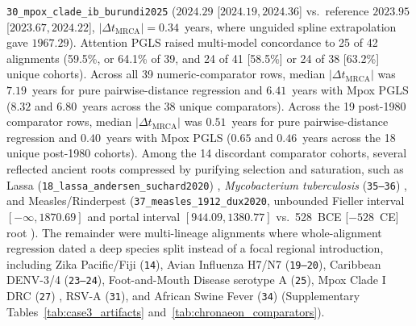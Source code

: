 \documentclass[11pt,letterpaper]{article}
\begin{document}
\texttt{30\_mpox\_clade\_ib\_burundi2025} ($2024.29$ [$2024.19, 2024.36$] vs.\ reference $2023.95$ [$2023.67, 2024.22$], $|\Delta t_{\mathrm{MRCA}}| = 0.34$~years, where unguided spline extrapolation gave $1967.29$). Attention PGLS raised multi-model concordance to 25 of 42 alignments (59.5\%, or 64.1\% of 39, and 24 of 41 [58.5\%] or 24 of 38 [63.2\%] unique cohorts). Across all 39 numeric-comparator rows, median $|\Delta t_{\mathrm{MRCA}}|$ was $7.19$~years for pure pairwise-distance regression and $6.41$~years with Mpox PGLS ($8.32$ and $6.80$~years across the 38 unique comparators). Across the 19 post-1980 comparator rows, median $|\Delta t_{\mathrm{MRCA}}|$ was $0.51$~years for pure pairwise-distance regression and $0.40$~years with Mpox PGLS ($0.65$ and $0.46$~years across the 18 unique post-1980 cohorts). Among the 14 discordant comparator cohorts, several reflected ancient roots compressed by purifying selection and saturation, such as Lassa (\texttt{18\_lassa\_andersen\_suchard2020}) \cite{andersen2015lassa, suchard2020lassa}, \textit{Mycobacterium tuberculosis} (\texttt{35--36}) \cite{comas2013mtb, bos2014mtb}, and Measles/Rinderpest (\texttt{37\_measles\_1912\_dux2020}, unbounded Fieller interval $[-\infty, 1870.69]$ \cite{fieller1954some} and portal interval $[944.09, 1380.77]$ vs.\ 528~BCE [$-528$~CE] root \cite{dux2020measles}). The remainder were multi-lineage alignments where whole-alignment regression dated a deep species split instead of a focal regional introduction, including Zika Pacific/Fiji (\texttt{14}), Avian Influenza H7/N7 (\texttt{19--20}), Caribbean DENV-3/4 (\texttt{23--24}), Foot-and-Mouth Disease serotype A (\texttt{25}), Mpox Clade I DRC (\texttt{27}) \cite{patrono2022mpox}, RSV-A (\texttt{31}), and African Swine Fever (\texttt{34}) (Supplementary Tables~\ref{tab:case3_artifacts} and~\ref{tab:chronaeon_comparators}).
\end{document}
